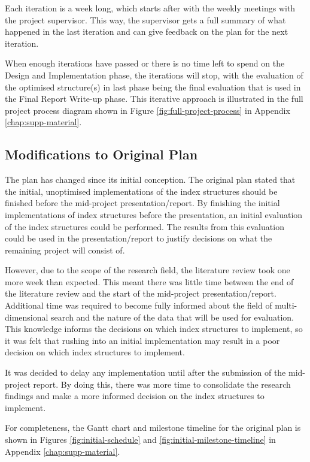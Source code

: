 Each iteration is a week long, which starts after with the weekly meetings with the project supervisor. This way, the supervisor gets a full summary of what happened in the last iteration and can give feedback on the plan for the next iteration.

When enough iterations have passed or there is no time left to spend on the Design and Implementation phase, the iterations will stop, with the evaluation of the optimised structure(s) in last phase being the final evaluation that is used in the Final Report Write-up phase. This iterative approach is illustrated in the full project process diagram shown in Figure \ref{fig:full-project-process} in Appendix \ref{chap:supp-material}.

\subsection{Modifications to Original Plan}

The plan has changed since its initial conception. The original plan stated that the initial, unoptimised implementations of the index structures should be finished before the mid-project presentation/report. By finishing the initial implementations of index structures before the presentation, an initial evaluation of the index structures could be performed. The results from this evaluation could be used in the presentation/report to justify decisions on what the remaining project will consist of.

However, due to the scope of the research field, the literature review took one more week than expected. This meant there was little time between the end of the literature review and the start of the mid-project presentation/report. Additional time was required to become fully informed about the field of multi-dimensional search and the nature of the data that will be used for evaluation. This knowledge informs the decisions on which index structures to implement, so it was felt that rushing into an initial implementation may result in a poor decision on which index structures to implement.

It was decided to delay any implementation until after the submission of the mid-project report. By doing this, there was more time to consolidate the research findings and make a more informed decision on the index structures to implement.

For completeness, the Gantt chart and milestone timeline for the original plan is shown in Figures \ref{fig:initial-schedule} and \ref{fig:initial-milestone-timeline} in Appendix \ref{chap:supp-material}.

